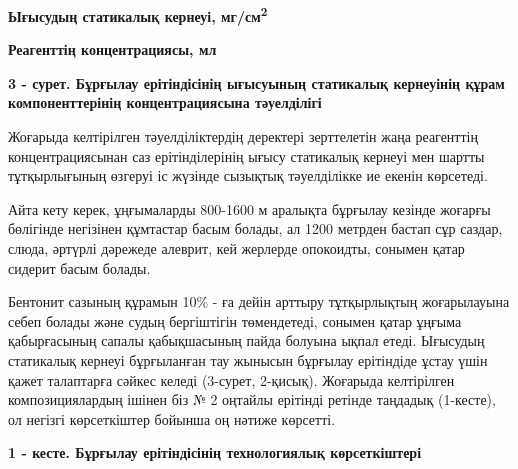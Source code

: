 {\bfseries Ығысудың статикалық кернеуі, мг/см\textsuperscript{2}}

{\bfseries Реагенттің концентрациясы, мл}

{\bfseries 3 - сурет. Бұрғылау ерітіндісінің ығысуының статикалық кернеуінің
құрам компоненттерінің концентрациясына тәуелділігі}

\begin{multicols}{2}
Жоғарыда келтірілген тәуелділіктердің деректері зерттелетін жаңа
реагенттің концентрациясынан саз ерітінділерінің ығысу статикалық
кернеуі мен шартты тұтқырлығының өзгеруі іс жүзінде сызықтық
тәуелділікке ие екенін көрсетеді.

Айта кету керек, ұңғымаларды 800-1600 м аралықта бұрғылау кезінде
жоғарғы бөлігінде негізінен құмтастар басым болады, ал 1200 метрден
бастап сұр саздар, слюда, әртүрлі дәрежеде алеврит, кей жерлерде
опокоидты, сонымен қатар сидерит басым болады.

Бентонит сазының құрамын 10\% - ға дейін арттыру тұтқырлықтың
жоғарылауына себеп болады және судың бергіштігін төмендетеді, сонымен
қатар ұңғыма қабырғасының сапалы қабықшасының пайда болуына ықпал етеді.
Ығысудың статикалық кернеуі бұрғыланған тау жынысын бұрғылау ерітіндіде
ұстау үшін қажет талаптарға сәйкес келеді (3-сурет, 2-қисық). Жоғарыда
келтірілген композициялардың ішінен біз № 2 оңтайлы ерітінді ретінде
таңдадық (1-кесте), ол негізгі көрсеткіштер бойынша оң нәтиже көрсетті.
\end{multicols}

{\bfseries 1 - кесте. Бұрғылау ерітіндісінің технологиялық көрсеткіштері}

